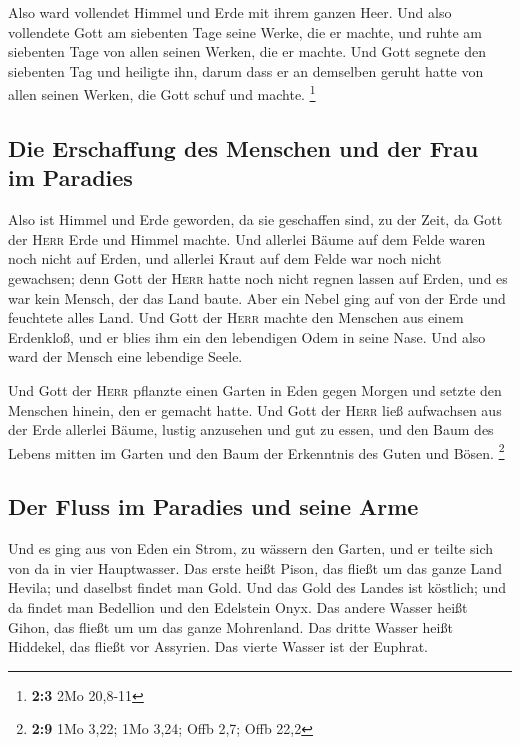  Also ward vollendet Himmel und Erde mit ihrem ganzen
Heer.  Und also vollendete Gott am siebenten Tage seine
Werke, die er machte, und ruhte am siebenten Tage von allen seinen
Werken, die er machte.  Und Gott segnete den siebenten Tag
und heiligte ihn, darum dass er an demselben geruht hatte von allen
seinen Werken, die Gott schuf und machte. \footnote{\textbf{2:3} 2Mo
  20,8-11}

\hypertarget{die-erschaffung-des-menschen-und-der-frau-im-paradies}{%
\subsection{Die Erschaffung des Menschen und der Frau im
Paradies}\label{die-erschaffung-des-menschen-und-der-frau-im-paradies}}

 Also ist Himmel und Erde geworden, da sie geschaffen
sind, zu der Zeit, da Gott der \textsc{Herr} Erde und Himmel machte.
 Und allerlei Bäume auf dem Felde waren noch nicht auf
Erden, und allerlei Kraut auf dem Felde war noch nicht gewachsen; denn
Gott der \textsc{Herr} hatte noch nicht regnen lassen auf Erden, und es
war kein Mensch, der das Land baute.  Aber ein Nebel ging
auf von der Erde und feuchtete alles Land.  Und Gott der
\textsc{Herr} machte den Menschen aus einem Erdenkloß, und er blies ihm
ein den lebendigen Odem in seine Nase. Und also ward der Mensch eine
lebendige Seele.

 Und Gott der \textsc{Herr} pflanzte einen Garten in Eden
gegen Morgen und setzte den Menschen hinein, den er gemacht hatte.
 Und Gott der \textsc{Herr} ließ aufwachsen aus der Erde
allerlei Bäume, lustig anzusehen und gut zu essen, und den Baum des
Lebens mitten im Garten und den Baum der Erkenntnis des Guten und Bösen.
\footnote{\textbf{2:9} 1Mo 3,22; 1Mo 3,24; Offb 2,7; Offb 22,2}

\hypertarget{der-fluss-im-paradies-und-seine-arme}{%
\subsection{Der Fluss im Paradies und seine
Arme}\label{der-fluss-im-paradies-und-seine-arme}}

 Und es ging aus von Eden ein Strom, zu wässern den
Garten, und er teilte sich von da in vier Hauptwasser. 
Das erste heißt Pison, das fließt um das ganze Land Hevila; und daselbst
findet man Gold.  Und das Gold des Landes ist köstlich;
und da findet man Bedellion und den Edelstein Onyx.  Das
andere Wasser heißt Gihon, das fließt um um das ganze Mohrenland.
 Das dritte Wasser heißt Hiddekel, das fließt vor
Assyrien. Das vierte Wasser ist der Euphrat.

